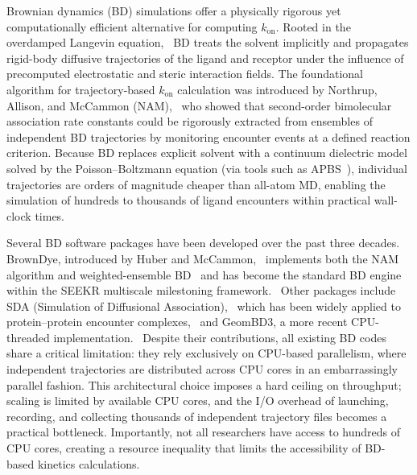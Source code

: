 \documentclass[journal=jctcce,manuscript=article,layout=twocolumn]{achemso}
\newcommand{\kon}{k_{\mathrm{on}}}
\begin{document}
Brownian dynamics (BD) simulations offer a physically rigorous yet computationally
efficient alternative for computing $\kon$. Rooted in the overdamped Langevin
equation,~\cite{Ermak1978} BD treats the solvent implicitly and propagates rigid-body
diffusive trajectories of the ligand and receptor under the influence of precomputed
electrostatic and steric interaction fields. The foundational algorithm for
trajectory-based $\kon$ calculation was introduced by Northrup, Allison, and
McCammon (NAM),~\cite{Northrup1984} who showed that second-order bimolecular association
rate constants could be rigorously extracted from ensembles of independent BD
trajectories by monitoring encounter events at a defined reaction criterion. Because BD
replaces explicit solvent with a continuum dielectric model solved by the
Poisson--Boltzmann equation (via tools such as APBS~\cite{Baker2001APBS,Jurrus2018APBS}),
individual trajectories are orders of magnitude cheaper than all-atom MD, enabling the
simulation of hundreds to thousands of ligand encounters within practical wall-clock
times.~\cite{Huber2019review,MunizChicharro2023}

Several BD software packages have been developed over the past three decades. BrownDye,
introduced by Huber and McCammon,~\cite{Huber2010BrownDye} implements both the NAM
algorithm and weighted-ensemble BD~\cite{Huber1996WE} and has become the standard BD
engine within the SEEKR multiscale milestoning
framework.~\cite{Votapka2017SEEKR,Votapka2022SEEKR2} Other packages include SDA
(Simulation of Diffusional Association),~\cite{Gabdoulline1997,Martinez2015SDA7} which
has been widely applied to protein--protein encounter
complexes,~\cite{Gabdoulline1998encounter} and GeomBD3, a more recent CPU-threaded
implementation.~\cite{Cholko2022GeomBD3} Despite their contributions, all existing BD
codes share a critical limitation: they rely exclusively on CPU-based parallelism, where
independent trajectories are distributed across CPU cores in an embarrassingly parallel
fashion. This architectural choice imposes a hard ceiling on throughput; scaling is
limited by available CPU cores, and the I/O overhead of launching, recording, and
collecting thousands of independent trajectory files becomes a practical bottleneck.
Importantly, not all researchers have access to hundreds of CPU cores, creating a
resource inequality that limits the accessibility of BD-based kinetics
calculations.~\cite{Cholko2022GeomBD3}
\end{document}
